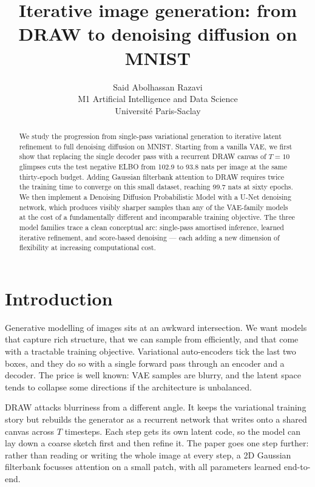 \documentclass{article}
\title{Iterative image generation: from DRAW to denoising diffusion on MNIST}
\author{Said Abolhassan Razavi \\
M1 Artificial Intelligence and Data Science \\
Universit\'e Paris-Saclay}
\newcommand{\vaeNelbo}{102.9}
\newcommand{\drawNoAttnNelbo}{93.8}
\newcommand{\drawAttnNelbo}{99.7}           %
\begin{document}
\maketitle

\begin{abstract}
We study the progression from single-pass variational generation to iterative
latent refinement to full denoising diffusion on MNIST.
Starting from a vanilla VAE, we first show that replacing the single decoder
pass with a recurrent DRAW canvas of \(T=10\) glimpses cuts the test negative
ELBO from \vaeNelbo{} to \drawNoAttnNelbo{} nats per image at the same
thirty-epoch budget.
Adding Gaussian filterbank attention to DRAW requires twice the training time
to converge on this small dataset, reaching \drawAttnNelbo{} nats at sixty
epochs.
We then implement a Denoising Diffusion Probabilistic Model
\citep{ho2020ddpm} with a U-Net \citep{ronneberger2015unet} denoising network,
which produces visibly sharper samples than any of the VAE-family models
at the cost of a fundamentally different and incomparable training objective.
The three model families trace a clean conceptual arc: single-pass amortised
inference, learned iterative refinement, and score-based denoising --- each
adding a new dimension of flexibility at increasing computational cost.
\end{abstract}

\section{Introduction}
\label{sec:intro}

Generative modelling of images sits at an awkward intersection. We want models
that capture rich structure, that we can sample from efficiently, and that come
with a tractable training objective. Variational auto-encoders
\citep{kingma2014vae,rezende2014stochastic} tick the last two boxes, and they
do so with a single forward pass through an encoder and a decoder. The price is
well known: VAE samples are blurry, and the latent space tends to collapse some
directions if the architecture is unbalanced.

DRAW \citep{gregor2015draw} attacks blurriness from a different angle. It keeps
the variational training story but rebuilds the generator as a recurrent network
that writes onto a shared canvas across \(T\) timesteps. Each step gets its own
latent code, so the model can lay down a coarse sketch first and then refine it.
The paper goes one step further: rather than reading or writing the whole image
at every step, a 2D Gaussian filterbank focusses attention on a small patch,
with all parameters learned end-to-end.
\end{document}
